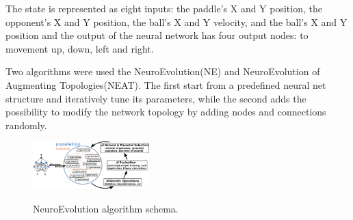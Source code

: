 The state is represented as eight inputs: the paddle's X and Y position, the opponent's X and Y position, the ball's X and Y velocity,
and the ball's X and Y position and the output of the neural network has four output nodes: to movement up, down, left and right.

Two algorithms were used the NeuroEvolution(NE) and NeuroEvolution of Augmenting Topologies(NEAT).
The first start from a predefined neural net structure and iteratively tune its parameters, while the second adds the possibility to modify the network topology by adding nodes and connections randomly.



\begin{figure}[ht]
  \centering
  \includegraphics[width=0.4\textwidth]{images/neuroevolution.png}
  \label{ne}
  \caption{NeuroEvolution algorithm schema.}
\end{figure}
